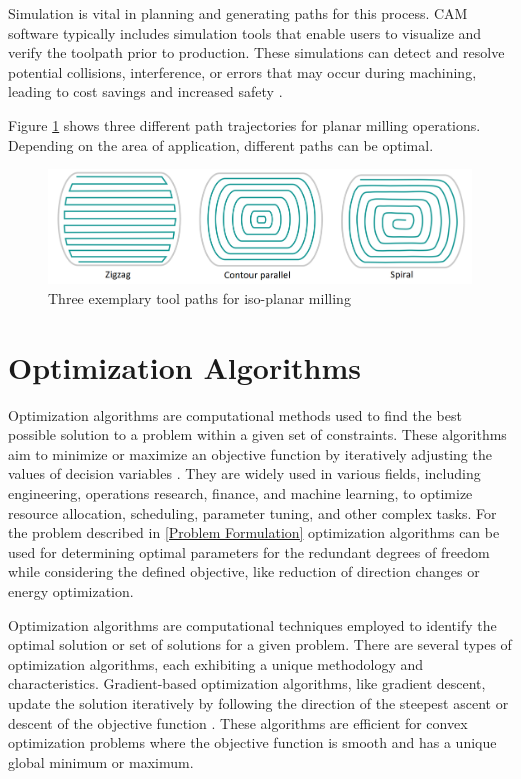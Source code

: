 Simulation is vital in planning and generating paths for this process. CAM software typically includes simulation tools that enable users to visualize and verify the toolpath prior to production. These simulations can detect and resolve potential collisions, interference, or errors that may occur during machining, leading to cost savings and increased safety \cite{Dubovska.2014}. 

Figure \ref{3path} shows three different path trajectories for planar milling operations. Depending on the area of application, different paths can be optimal. 

\begin{figure}[H]
	\centerline{\includegraphics[scale=.35]{figures/path.png}}
	\caption{Three exemplary tool paths for iso-planar milling \cite{Zhao.2018}}
	\label{3path}
\end{figure}

\section{Optimization Algorithms}%

Optimization algorithms are computational methods used to find the best possible solution to a problem within a given set of constraints. These algorithms aim to minimize or maximize an objective function by iteratively adjusting the values of decision variables \cite{Sivanandam.2007b}. They are widely used in various fields, including engineering, operations research, finance, and machine learning, to optimize resource allocation, scheduling, parameter tuning, and other complex tasks. For the problem described in \ref{Problem Formulation} optimization algorithms can be used for determining optimal parameters for the redundant degrees of freedom while considering the defined objective, like reduction of direction changes or energy optimization. 


Optimization algorithms are computational techniques employed to identify the optimal solution or set of solutions for a given problem. There are several types of optimization algorithms, each exhibiting a unique methodology and characteristics. Gradient-based optimization algorithms, like gradient descent, update the solution iteratively by following the direction of the steepest ascent or descent of the objective function \cite{Ruder.2017}. These algorithms are efficient for convex optimization problems where the objective function is smooth and has a unique global minimum or maximum.

